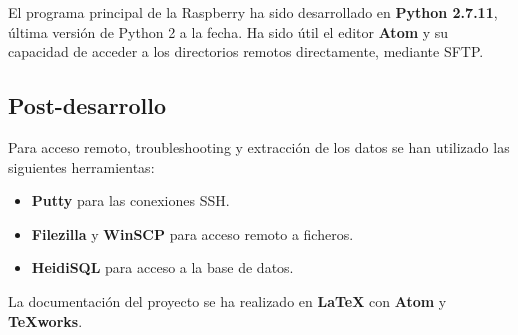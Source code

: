 El programa principal de la Raspberry ha sido desarrollado en \textbf{Python 2.7.11}, última versión de Python 2 a la fecha. Ha sido útil el editor \textbf{Atom} y su capacidad de acceder a los directorios remotos directamente, mediante SFTP.

\subsection{Post-desarrollo}

Para acceso remoto, troubleshooting y extracción de los datos se han utilizado las siguientes herramientas:
\begin{itemize}
  \item \textbf{Putty} para las conexiones SSH.
  \item \textbf{Filezilla} y \textbf{WinSCP} para acceso remoto a ficheros.
  \item \textbf{HeidiSQL} para acceso a la base de datos.
\end{itemize}

La documentación del proyecto se ha realizado en \textbf{\LaTeX} con \textbf{Atom} y \textbf{TeXworks}.
